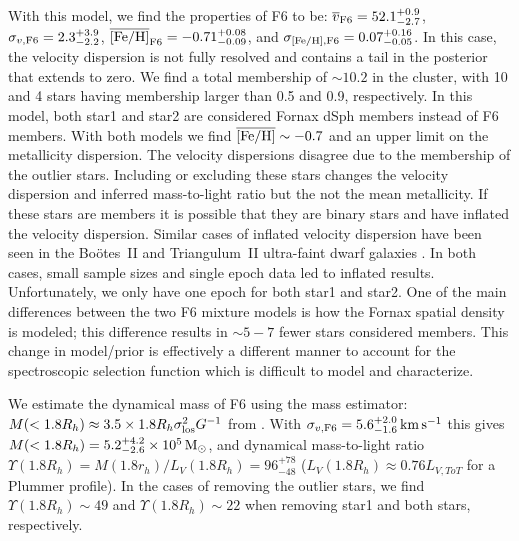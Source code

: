 \documentclass[twocolumn]{aastex63}
\newcommand{\stamp}[0]{F6\xspace}
\begin{document}
With this model, we find the properties of \stamp to be:
$\overline{v}_{\rm F6} = 52.1_{-2.7}^{+0.9}$,
$\sigma_{v,{\rm F6}} = 2.3_{-2.2}^{+3.9}$,
$\overline{\rm [Fe/H]}_{\rm F6} = -0.71_{-0.09}^{+0.08}$, and
$\sigma_{\rm [Fe/H], {\rm F6}} = 0.07_{-0.05}^{+0.16}$.
In this case, the velocity dispersion is not fully resolved and contains a tail in the posterior that extends to zero.
We find a total membership of $\sim10.2$ in the cluster, with 10 and 4 stars having membership larger than 0.5 and 0.9, respectively.
In this model, both star1 and star2 are considered Fornax dSph members instead of F6 members.
With both models we find $\overline{\rm [Fe/H]} \sim -0.7$ and an upper limit on the metallicity dispersion.  The velocity dispersions disagree due to the membership of the outlier stars. 
Including or excluding these stars changes the velocity dispersion and inferred mass-to-light ratio but the not the mean metallicity.
If these stars are members it is possible that they are binary stars and have inflated the velocity dispersion.
Similar cases of inflated velocity dispersion have been seen in the Bo\"{o}tes~II and Triangulum~II ultra-faint dwarf galaxies \citep{Koch2009ApJ...690..453K, Ji2016ApJ...817...41J, Kirby2015ApJ...814L...7K, Kirby2017ApJ...838...83K}. 
In both cases, small sample sizes and single epoch data led to inflated results.  Unfortunately, we only have one epoch for both star1 and star2. 
One of the main differences between the two F6 mixture models is how the Fornax spatial density is modeled; this difference results in $\sim5-7$ fewer stars considered members. This change in model/prior is effectively a different manner to account for the  spectroscopic selection function which is difficult to model and characterize. 


We estimate the dynamical mass of F6 using the mass estimator: $M(<1.8 R_h)\approx 3.5 \times 1.8 R_h \sigma_{\rm los}^2 G^{-1}$ from \citet{Errani2018MNRAS.481.5073E}.
With $\sigma_{v, {\rm F6}}=5.6_{-1.6}^{+2.0}\mathrm{\,km} \mathrm{\,s}^{-1}$ this gives $M(<1.8 R_h)=5.2_{-2.6}^{+4.2}\times 10^{5} \mathrm{\,M_\odot}$, and dynamical mass-to-light ratio 
$\Upsilon (1.8 R_h) = M(1.8 r_{h})/L_V (1.8 R_h) = 96_{-48}^{+78}$ ($L_V (1.8 R_h)\approx 0.76 L_{V, ToT}$ for a Plummer profile). 
In the cases of removing the outlier stars, we find $\Upsilon (1.8 R_h) \sim 49$ and $\Upsilon (1.8 R_h) \sim 22$ when removing star1 and both stars, respectively.
\end{document}
